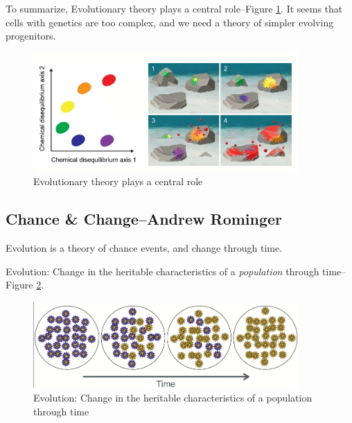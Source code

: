 \documentclass[]{article}
\begin{document}
To summarize, Evolutionary theory plays a central role--Figure \ref{fig:Baum2018a}\cite{baum2018origin}. It seems that cells with genetics are too complex, and we need a theory of simpler evolving progenitors.

\begin{figure}[H]
	\caption{Evolutionary theory plays a central role}\label{fig:Baum2018a}
	\includegraphics[width=0.9\textwidth]{Baum2018a}
\end{figure}


\subsection[Chance \& Change]{Chance \& Change--Andrew Rominger}


Evolution is a theory of chance events, and change through time.

Evolution: Change in the heritable characteristics of
a \textit{population} through time--Figure \ref{fig:ChangeThroughTime}.
\begin{figure}[H]
	\caption[Evolution]{Evolution: Change in the heritable characteristics of
		a population through time}\label{fig:ChangeThroughTime}
	\includegraphics[width=0.9\textwidth]{ChangeThroughTime}
\end{figure}
\end{document}
